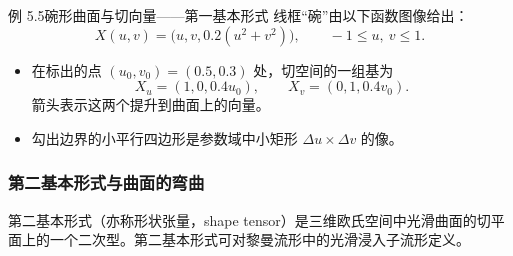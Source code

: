 \begin{statement}{例 5.5}{碗形曲面与切向量——第一基本形式}
线框“碗”由以下函数图像给出：
\[
  X(u,v)=\bigl(u,v,0.2(u^2+v^2)\bigr),\qquad -1\le u,\ v\le1.
\]
\begin{itemize}
  \item 在标出的点 $(u_0,v_0)=(0.5,0.3)$ 处，切空间的一组基为
  \[
    X_u=(1,0,0.4u_0),\qquad X_v=(0,1,0.4v_0).
  \]
  箭头表示这两个提升到曲面上的向量。
  \item 勾出边界的小平行四边形是参数域中小矩形 $\Delta u\times\Delta v$ 的像。
\end{itemize}
\end{statement}

\subsubsection{第二基本形式与曲面的弯曲}
第二基本形式（亦称形状张量，shape tensor）是三维欧氏空间中光滑曲面的切平面上的一个二次型。第二基本形式可对黎曼流形中的光滑浸入子流形定义。

